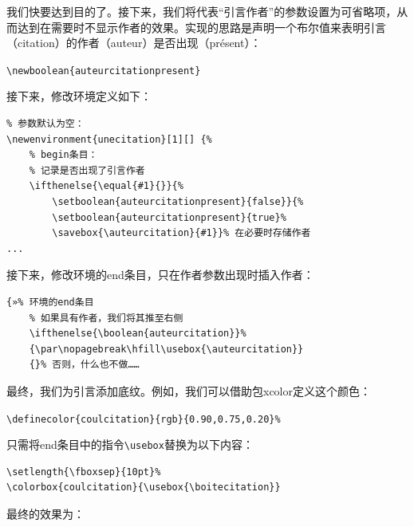 我们快要达到目的了。接下来，我们将代表“引言作者”的参数设置为可省略项，从而达到在需要时不显示作者的效果。实现的思路是声明一个布尔值来表明引言（citation）的作者（auteur）是否出现（présent）：

\begin{dmd}
\verb|\newboolean{auteurcitationpresent}|
\end{dmd}

接下来，修改环境定义如下：

\begin{dmd}
\begin{verbatim}
% 参数默认为空：
\newenvironment{unecitation}[1][] {%
    % begin条目：
    % 记录是否出现了引言作者
    \ifthenelse{\equal{#1}{}}{%
        \setboolean{auteurcitationpresent}{false}}{% 
        \setboolean{auteurcitationpresent}{true}% 
        \savebox{\auteurcitation}{#1}}% 在必要时存储作者
...
\end{verbatim}
\end{dmd}

接下来，修改环境的end条目，只在作者参数出现时插入作者：

\begin{dmd}
\begin{verbatim}
{»% 环境的end条目
    % 如果具有作者，我们将其推至右侧
    \ifthenelse{\boolean{auteurcitation}}% 
    {\par\nopagebreak\hfill\usebox{\auteurcitation}} 
    {}% 否则，什么也不做……
\end{verbatim}
\end{dmd}

最终，我们为引言添加底纹。例如，我们可以借助包\textsf{xcolor}定义这个颜色：

\begin{dmd}
\verb+\definecolor{coulcitation}{rgb}{0.90,0.75,0.20}%+
\end{dmd}

只需将end条目中的指令\verb|\usebox|替换为以下内容：

\begin{dmd}
\begin{verbatim}
\setlength{\fboxsep}{10pt}% 
\colorbox{coulcitation}{\usebox{\boitecitation}}
\end{verbatim}
\end{dmd}

最终的效果为：


